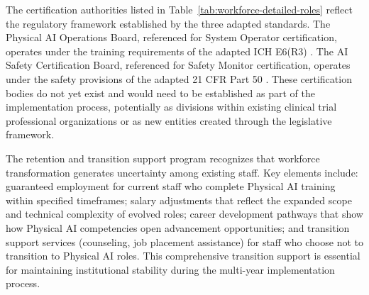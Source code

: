 The certification authorities listed in Table~\ref{tab:workforce-detailed-roles}
reflect the regulatory framework established by the three adapted standards.
The Physical AI Operations Board, referenced for System Operator certification,
operates under the training requirements of the adapted ICH E6(R3)
\cite{ich-adapt}. The AI Safety Certification Board, referenced for Safety
Monitor certification, operates under the safety provisions of the adapted
21 CFR Part 50 \cite{cfr50-adapt}. These certification bodies do not yet
exist and would need to be established as part of the implementation process,
potentially as divisions within existing clinical trial professional
organizations or as new entities created through the legislative framework.

The retention and transition support program recognizes that workforce
transformation generates uncertainty among existing staff. Key elements
include: guaranteed employment for current staff who complete Physical AI
training within specified timeframes; salary adjustments that reflect the
expanded scope and technical complexity of evolved roles; career development
pathways that show how Physical AI competencies open advancement
opportunities; and transition support services (counseling, job placement
assistance) for staff who choose not to transition to Physical AI roles.
This comprehensive transition support is essential for maintaining
institutional stability during the multi-year implementation process.
